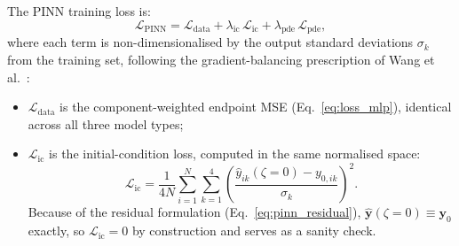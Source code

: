 \documentclass[a4paper,11pt]{article}
\newcommand{\loss}{\mathcal{L}}
\begin{document}
The PINN training loss is:
\begin{equation}
  \loss_\text{PINN} = \loss_\text{data}
    + \lambda_\text{ic}\,\loss_\text{ic}
    + \lambda_\text{pde}\,\loss_\text{pde},
  \label{eq:loss_pinn}
\end{equation}
where each term is non-dimensionalised by the output standard deviations
$\sigma_k$ from the training set, following the gradient-balancing
prescription of Wang et al.~\cite{Wang2021}:
\begin{itemize}
  \item $\loss_\text{data}$ is the component-weighted endpoint MSE
    (Eq.~\ref{eq:loss_mlp}), identical across all three model types;

  \item $\loss_\text{ic}$ is the initial-condition loss, computed in the
    same normalised space:
    \begin{equation}
      \loss_\text{ic} = \frac{1}{4N}\sum_{i=1}^{N}\sum_{k=1}^{4}
        \left(\frac{\hat{y}_{ik}(\zeta{=}0) - y_{0,ik}}{\sigma_k}
        \right)^{\!2}.
      \label{eq:loss_ic}
    \end{equation}
    Because of the residual formulation (Eq.~\ref{eq:pinn_residual}),
    $\hat{\mathbf{y}}(\zeta{=}0) \equiv \mathbf{y}_0$ exactly, so
    $\loss_\text{ic} = 0$ by construction and serves as a sanity check.


\end{itemize}
\end{document}
